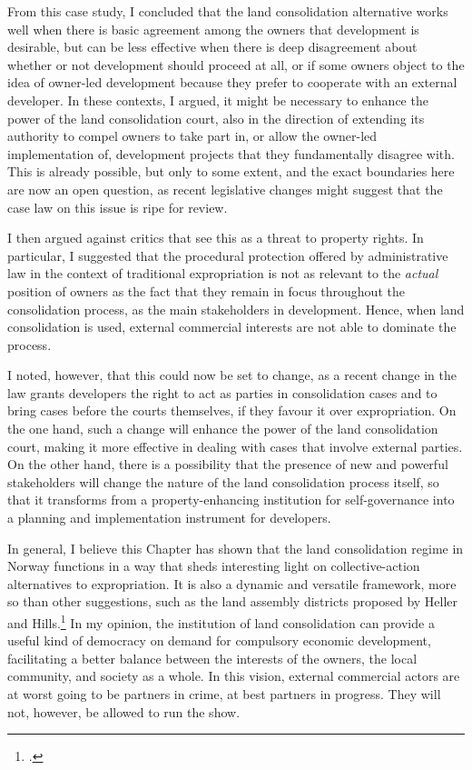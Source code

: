 From this case study, I concluded that the land consolidation alternative works well when there is basic agreement among the owners that development is desirable, but can be less effective when there is deep disagreement about whether or not development should proceed at all, or if some owners object to the idea of owner-led development because they prefer to cooperate with an external developer. In these contexts, I argued, it might be necessary to enhance the power of the land consolidation court, also in the direction of extending its authority to compel owners to take part in, or allow the owner-led implementation of, development projects that they fundamentally disagree with. This is already possible, but only to some extent, and the exact boundaries here are now an open question, as recent legislative changes might suggest that the case law on this issue is ripe for review.

I then argued against critics that see this as a threat to property rights. In particular, I suggested that the procedural protection offered by administrative law in the context of traditional expropriation is not as relevant to the {\it actual} position of owners as the fact that they remain in focus throughout the consolidation process, as the main stakeholders in development. Hence, when land consolidation is used, external commercial interests are not able to dominate the process. 

I noted, however, that this could now be set to change, as a recent change in the law grants developers the right to act as parties in consolidation cases and to bring cases before the courts themselves, if they favour it over expropriation. On the one hand, such a change will enhance the power of the land consolidation court, making it more effective in dealing with cases that involve external parties. On the other hand, there is a possibility that the presence of new and powerful stakeholders will change the nature of the land consolidation process itself, so that it transforms from a property-enhancing institution for self-governance into a planning and implementation instrument for developers.

In general, I believe this Chapter has shown that the land consolidation regime in Norway functions in a way that sheds interesting light on collective-action alternatives to expropriation. It is also a dynamic and versatile framework, more so than other suggestions, such as the land assembly districts proposed by Heller and Hills.\footcite{heller08} In my opinion, the institution of land consolidation can provide a useful kind of democracy on demand for compulsory economic development, facilitating a better balance between the interests of the owners, the local community, and society as a whole. In this vision, external commercial actors are at worst going to be partners in crime, at best partners in progress. They will not, however, be allowed to run the show.